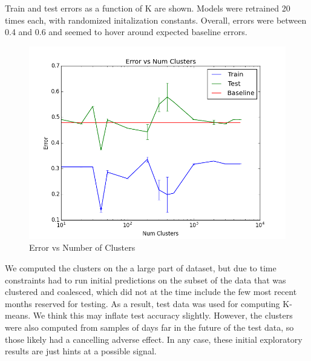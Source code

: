 Train and test errors as a function of K are shown. Models were retrained 20 times each, with randomized initalization constants. Overall, errors were between 0.4 and 0.6 and seemed to hover around expected baseline errors. 


\begin{figure}[ht]
\vskip 0.2in
\begin{center}
\centerline{\includegraphics[scale=0.15]{images/error_v_k.png}}
\caption{Error vs Number of Clusters}
\end{center}
\vskip -0.2in
\label{fig:error_v_k}
\end{figure} 

We computed the clusters on the a large part of dataset, but due to time constraints had to run initial predictions on the subset of the data that was clustered and coalesced, which did not at the time include the few most recent months reserved for testing. As a result, test data was used for computing K-means. We think this may inflate test accuracy slightly. However, the clusters were also computed from samples of days far in the future of the test data, so those likely had a cancelling adverse effect. In any case, these initial exploratory results are just hints at a possible signal.